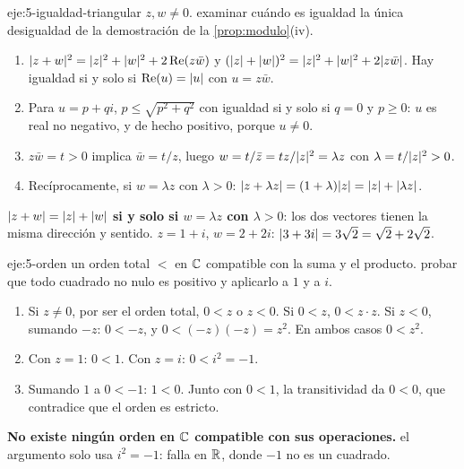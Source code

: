 \begin{solucion}{eje:5-igualdad-triangular}
\datos $z,w\ne0$.
\planteamiento examinar cuándo es igualdad la única desigualdad de la demostración de la \cref{prop:modulo}(iv).
\pasos
\begin{enumerate}[label=\arabic*.]
  \item $\lvert z+w\rvert^{2}=\lvert z\rvert^{2}+\lvert w\rvert^{2}+2\operatorname{Re}(z\bar w)$ y $(\lvert z\rvert+\lvert w\rvert)^{2}=\lvert z\rvert^{2}+\lvert w\rvert^{2}+2\lvert z\bar w\rvert$. Hay igualdad si y solo si $\operatorname{Re}(u)=\lvert u\rvert$ con $u=z\bar w$.
  \item Para $u=p+qi$, $p\le\sqrt{p^{2}+q^{2}}$ con igualdad si y solo si $q=0$ y $p\ge0$: $u$ es real no negativo, y de hecho positivo, porque $u\ne0$.
  \item $z\bar w=t>0$ implica $\bar w=t/z$, luego $w=t/\bar z=tz/\lvert z\rvert^{2}=\lambda z$ con $\lambda=t/\lvert z\rvert^{2}>0$.
  \item Recíprocamente, si $w=\lambda z$ con $\lambda>0$: $\lvert z+\lambda z\rvert=(1+\lambda)\lvert z\rvert=\lvert z\rvert+\lvert\lambda z\rvert$.
\end{enumerate}
\resultado \textbf{$\lvert z+w\rvert=\lvert z\rvert+\lvert w\rvert$ si y solo si $w=\lambda z$ con $\lambda>0$}: los dos vectores tienen la misma dirección y sentido.
\comprobacion $z=1+i$, $w=2+2i$: $\lvert3+3i\rvert=3\sqrt2=\sqrt2+2\sqrt2$.
\end{solucion}

\begin{solucion}{eje:5-orden}
\datos un orden total $<$ en $\mathbb{C}$ compatible con la suma y el producto.
\planteamiento probar que todo cuadrado no nulo es positivo y aplicarlo a $1$ y a $i$.
\pasos
\begin{enumerate}[label=\arabic*.]
  \item Si $z\ne0$, por ser el orden total, $0<z$ o $z<0$. Si $0<z$, $0<z\cdot z$. Si $z<0$, sumando $-z$: $0<-z$, y $0<(-z)(-z)=z^{2}$. En ambos casos $0<z^{2}$.
  \item Con $z=1$: $0<1$. Con $z=i$: $0<i^{2}=-1$.
  \item Sumando $1$ a $0<-1$: $1<0$. Junto con $0<1$, la transitividad da $0<0$, que contradice que el orden es estricto.
\end{enumerate}
\resultado \textbf{No existe ningún orden en $\mathbb{C}$ compatible con sus operaciones.}
\comprobacion el argumento solo usa $i^{2}=-1$: falla en $\mathbb{R}$, donde $-1$ no es un cuadrado.
\end{solucion}

